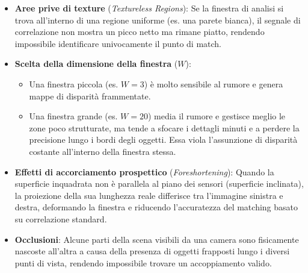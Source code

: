 ﻿\documentclass[11pt, a4paper]{article}
\begin{document}
\begin{itemize}
    \item \textbf{Aree prive di texture} (\emph{Textureless Regions}): Se la finestra di analisi si trova all'interno di una regione uniforme (es. una parete bianca), il segnale di correlazione non mostra un picco netto ma rimane piatto, rendendo impossibile identificare univocamente il punto di match.


    \item \textbf{Scelta della dimensione della finestra} ($W$):
    \begin{itemize}
        \item Una finestra piccola (es. $W=3$) è molto sensibile al rumore e genera mappe di disparità frammentate.
        \item Una finestra grande (es. $W=20$) media il rumore e gestisce meglio le zone poco strutturate, ma tende a sfocare i dettagli minuti e a perdere la precisione lungo i bordi degli oggetti. Essa viola l'assunzione di disparità costante all'interno della finestra stessa.
    \end{itemize}


    \item \textbf{Effetti di accorciamento prospettico} (\emph{Foreshortening}): Quando la superficie inquadrata non è parallela al piano dei sensori (superficie inclinata), la proiezione della sua lunghezza reale differisce tra l'immagine sinistra e destra, deformando la finestra e riducendo l'accuratezza del matching basato su correlazione standard.


    \item \textbf{Occlusioni}: Alcune parti della scena visibili da una camera sono fisicamente nascoste all'altra a causa della presenza di oggetti frapposti lungo i diversi punti di vista, rendendo impossibile trovare un accoppiamento valido.

\end{itemize}
\end{document}
